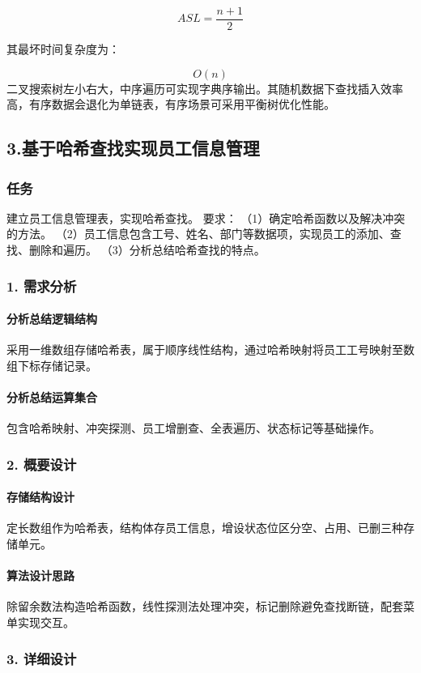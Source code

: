\documentclass{ctexart}
\begin{document}
$$
ASL = \frac{n+1}{2}
$$

其最坏时间复杂度为：

$$
O(n)
$$
二叉搜索树左小右大，中序遍历可实现字典序输出。其随机数据下查找插入效率高，有序数据会退化为单链表，有序场景可采用平衡树优化性能。


\subsection {3.基于哈希查找实现员工信息管理}
\subsubsection {任务}
建立员工信息管理表，实现哈希查找。 要求： （1）确定哈希函数以及解决冲突的方法。 （2）员工信息包含工号、姓名、部门等数据项，实现员工的添加、查找、删除和遍历。 （3）分析总结哈希查找的特点。
\subsubsection{1. 需求分析}
\paragraph{分析总结逻辑结构}
采用一维数组存储哈希表，属于顺序线性结构，通过哈希映射将员工工号映射至数组下标存储记录。
\paragraph{分析总结运算集合}
包含哈希映射、冲突探测、员工增删查、全表遍历、状态标记等基础操作。
\subsubsection{2. 概要设计}
\paragraph{存储结构设计}
定长数组作为哈希表，结构体存员工信息，增设状态位区分空、占用、已删三种存储单元。
\paragraph{算法设计思路}
除留余数法构造哈希函数，线性探测法处理冲突，标记删除避免查找断链，配套菜单实现交互。
\subsubsection{3. 详细设计}
\end{document}
